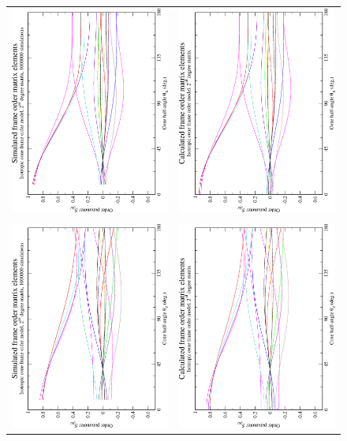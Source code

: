 \begin{figure}
\centering
  \begin{tabular}{@{}cc@{}}
    \includegraphics[width=.35\textwidth,angle=270]{images/frame_order_matrix/Sijkl_iso_cone_out_of_frame_theta_x_ens1000000.eps} &
    \includegraphics[width=.35\textwidth,angle=270]{images/frame_order_matrix/Sijkl_iso_cone_out_of_frame_theta_x_calc.eps} \\
    \\[-5pt]
    \includegraphics[width=.35\textwidth,angle=270]{images/frame_order_matrix/Sijkl_iso_cone_out_of_frame_theta_z_ens1000000.eps} &
    \includegraphics[width=.35\textwidth,angle=270]{images/frame_order_matrix/Sijkl_iso_cone_out_of_frame_theta_z_calc.eps} \\

\end{tabular}
\end{figure}

